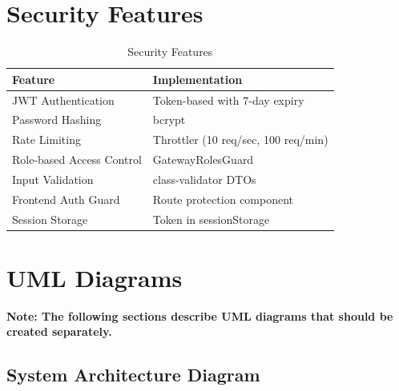 \documentclass[12pt,a4paper]{article}
\begin{document}
\begin{figure}[h]
\centering
{}
\end{figure}

\newpage

\section{Security Features}
\label{sec:security}

\begin{table}[h]
\centering
\caption{Security Features}
\begin{tabular}{@{}ll@{}}
\toprule
Feature & Implementation \\
\midrule
JWT Authentication & Token-based with 7-day expiry \\
Password Hashing & bcrypt \\
Rate Limiting & Throttler (10 req/sec, 100 req/min) \\
Role-based Access Control & GatewayRolesGuard \\
Input Validation & class-validator DTOs \\
Frontend Auth Guard & Route protection component \\
Session Storage & Token in sessionStorage \\
\bottomrule
\end{tabular}
\end{table}

\newpage

\section{UML Diagrams}
\label{sec:uml}

\bigskip
\noindent\textbf{Note: The following sections describe UML diagrams that should be created separately.}

\subsection{System Architecture Diagram}
\end{document}
